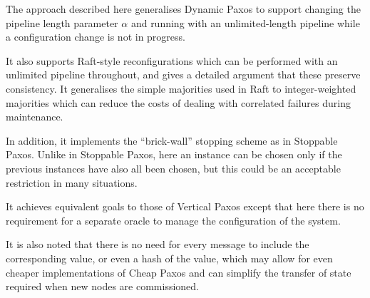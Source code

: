 \documentclass[journal]{IEEEtran}
\begin{document}
The approach described here generalises Dynamic Paxos\cite{cheap-paxos} to
support changing the pipeline length parameter $\alpha$ and running with an
unlimited-length pipeline while a configuration change is not in progress.

It also supports Raft-style reconfigurations\cite{raft} which can be performed
with an unlimited pipeline throughout, and gives a detailed argument that these
preserve consistency. It generalises the simple majorities used in Raft to
integer-weighted majorities which can reduce the costs of dealing with
correlated failures during maintenance.

In addition, it implements the ``brick-wall'' stopping scheme as in Stoppable
Paxos\cite{stoppable-paxos}. Unlike in Stoppable Paxos, here an instance can be
chosen only if the previous instances have also all been chosen, but this could
be an acceptable restriction in many situations.

It achieves equivalent goals to those of Vertical Paxos\cite{vertical-paxos}
except that here there is no requirement for a separate oracle to manage the
configuration of the system.

It is also noted that there is no need for every message to include the
corresponding value, or even a hash of the value, which may allow for even
cheaper implementations of Cheap Paxos\cite{cheap-paxos} and can simplify the
transfer of state\cite{vertical-paxos} required when new nodes are
commissioned.

%
%
\end{document}
